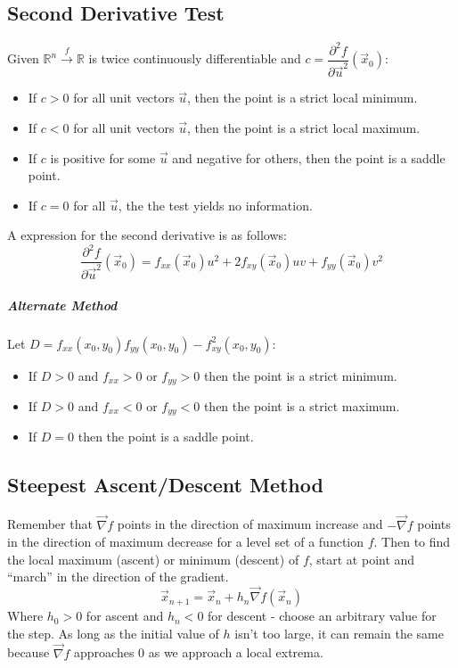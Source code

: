 \documentclass[11pt]{article}
\begin{document}
	\subsection{Second Derivative Test}
		Given $\mathbb{R}^n \xrightarrow{f} \mathbb{R}$ is twice continuously differentiable and $c = \dfrac{\partial^2 f}{\partial \vec{u}^2} (\vec{x}_0)$:
		\begin{itemize}
			\item If $c > 0$ for all unit vectors $\vec{u}$, then the point is a strict local minimum.
			\item If $c < 0$ for all unit vectors $\vec{u}$, then the point is a strict local maximum.
			\item If $c$ is positive for some $\vec{u}$ and negative for others, then the point is a saddle point.
			\item If $c = 0$ for all $\vec{u}$, the the test yields no information.
		\end{itemize}
		
		A expression for the second derivative is as follows:
		\begin{equation}
			\frac{\partial^2 f}{\partial \vec{u}^2}(\vec{x}_0) = f_{xx}(\vec{x}_0)u^2 + 2f_{xy}(\vec{x}_0)uv + f_{yy}(\vec{x}_0)v^2
		\end{equation}
		
	\subparagraph{Alternate Method} Let $D = f_{xx}(x_0, y_0)f_{yy}(x_0, y_0) - f_{xy}^2 (x_0, y_0)$:
		\begin{itemize}
			\item If $D > 0$ and $f_{xx} > 0$ or $f_{yy} > 0$ then the point is a strict minimum.
			\item If $D > 0$ and $f_{xx} < 0$ or $f_{yy} < 0$ then the point is a strict maximum.
			\item If $D = 0$ then the point is a saddle point.
		\end{itemize}
		
	\subsection{Steepest Ascent/Descent Method}
		Remember that $\vec{\nabla} f$ points in the direction of maximum increase and $-\vec{\nabla} f$ points in the direction of maximum decrease for a level set of a function $f$. Then to find the local maximum (ascent) or minimum (descent) of $f$, start at point and ``march'' in the direction of the gradient.
		\begin{equation}
			\vec{x}_{n+1} = \vec{x}_n + h_n \vec{\nabla} f(\vec{x}_n)
		\end{equation}
		Where $h_0 > 0$ for ascent and $h_n < 0$ for descent - choose an arbitrary value for the step. As long as the initial value of $h$ isn't too large, it can remain the same because $\vec{\nabla} f$ approaches 0 as we approach a local extrema.
		
\end{document}
